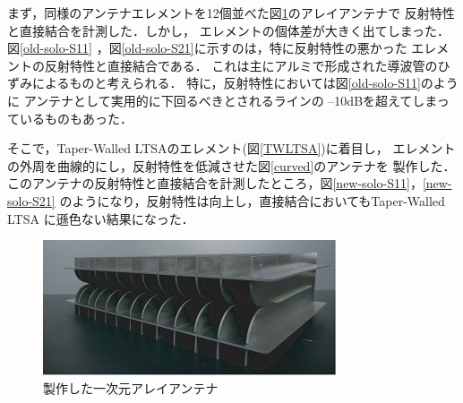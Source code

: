 ﻿\documentclass[12pt,oneside]{jsbook}
\begin{document}
まず，同様のアンテナエレメントを12個並べた図\ref{pic:array}のアレイアンテナで
反射特性と直接結合を計測した．しかし，
エレメントの個体差が大きく出てしまった．図\ref{old-solo-S11}
，図\ref{old-solo-S21}に示すのは，特に反射特性の悪かった
エレメントの反射特性と直接結合である．
これは主にアルミで形成された導波管のひずみによるものと考えられる．
特に，反射特性においては図\ref{old-solo-S11}のように
アンテナとして実用的に下回るべきとされるラインの
--10dBを超えてしまっているものもあった．

そこで，Taper-Walled LTSAのエレメント(図\ref{TWLTSA})に着目し，
エレメントの外周を曲線的にし，反射特性を低減させた図\ref{curved}のアンテナを
製作した．
このアンテナの反射特性と直接結合を計測したところ，図\ref{new-solo-S11}，\ref{new-solo-S21}
のようになり，反射特性は向上し，直接結合においてもTaper-Walled LTSA
に遜色ない結果になった．

\begin{figure}[t]
\begin{center}
\includegraphics[width =\hsize]{array_antenna.png}
\caption{製作した一次元アレイアンテナ} \label{pic:array} 
\end{center}
\end{figure}
\end{document}
